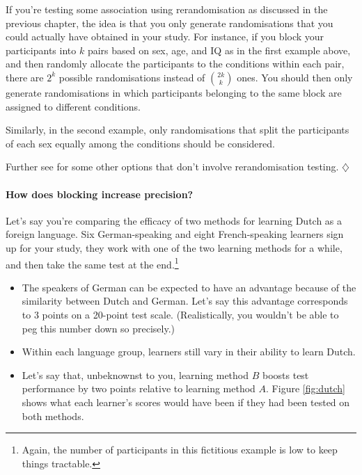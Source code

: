 \documentclass[a4paper]{tufte-book}\usepackage[]{graphicx}\usepackage[]{xcolor}
\newcommand*{\parend}[1][$\diamondsuit$]{%
\leavevmode\unskip\penalty9999 \hbox{}\nobreak\hfill
    \quad\hbox{#1}%
}
\begin{document}
If you're testing some association using rerandomisation
as discussed in the previous chapter, the idea is that you only
generate randomisations that you could actually have obtained in your study.
For instance, if you block your participants into $k$ pairs based on sex, age, and IQ
as in the first example above, and then randomly allocate the participants
to the conditions within each pair, there are $2^k$ possible randomisations
instead of ${2k} \choose k$ ones.
You should then only generate randomisations in which participants belonging
to the same block are assigned to different conditions.

Similarly, in the second example, only randomisations that split the participants
of each sex equally among the conditions should be considered.

 Further see \citet{Vanhove2015} for some other options that don't
 involve rerandomisation testing.
\parend

\paragraph{How does blocking increase precision?}
Let's say you're comparing the efficacy of two methods for learning Dutch
as a foreign language. Six German-speaking and eight French-speaking learners
sign up for your study, they work with one of the two learning methods for a while,
and then take the same test at the end.\footnote{Again, the number of participants in this
fictitious example is low to keep things tractable.}
\begin{itemize}
  \item The speakers of German can be expected to have
an advantage because of the similarity between Dutch and German. Let's say this
advantage corresponds to 3 points on a 20-point test scale. (Realistically,
you wouldn't be able to peg this number down so precisely.)

  \item Within each language group, learners still vary in their ability to
  learn Dutch.

  \item Let's say that, unbeknownst to you, learning method $B$ boosts
  test performance by two points relative to learning method $A$.
  Figure \ref{fig:dutch} shows what each learner's scores would have
  been if they had been tested on both methods.
\end{itemize}
\end{document}
